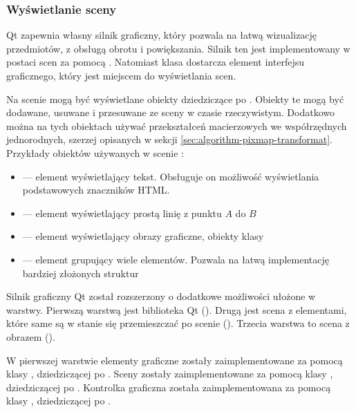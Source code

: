 \subsubsection{Wyświetlanie sceny}
\par
Qt zapewnia własny silnik graficzny, który pozwala na łatwą wizualizację przedmiotów, z obsługą obrotu i powiększania.
Silnik ten jest implementowany w postaci scen za pomocą .
Natomiast klasa  dostarcza element interfejsu graficznego, który jest miejscem do wyświetlania scen.
\par
Na scenie mogą być wyświetlane obiekty dziedziczące po .
Obiekty te mogą być dodawane, usuwane i przesuwane ze sceny w czasie rzeczywistym.
Dodatkowo można na tych obiektach używać przekształceń macierzowych we współrzędnych jednorodnych, szerzej opisanych w sekcji \ref{sec:algorithm-pixmap-transformat}.
Przykłady obiektów używanych w scenie :
\begin{itemize}
    \item {} --- element wyświetlający tekst.
          Obsługuje on możliwość wyświetlania podstawowych znaczników HTML.
    \item {} --- element wyświetlający prostą linię z punktu $A$ do $B$
    \item {} --- element wyświetlający obrazy graficzne, obiekty klasy 
    \item {} --- element grupujący wiele elementów.
          Pozwala na łatwą implementację bardziej złożonych struktur
\end{itemize}
\par
Silnik graficzny Qt został rozszerzony o dodatkowe możliwości ułożone w warstwy.
Pierwszą warstwą jest biblioteka Qt ().
Drugą jest scena z elementami, które same są w stanie się przemieszczać po scenie ().
Trzecia warstwa to scena z obrazem \DICOM ().
\par
W pierwszej warstwie elementy graficzne zostały zaimplementowane za pomocą klasy , dziedziczącej po .
Sceny zostały zaimplementowane za pomocą klasy , dziedziczącej po .
Kontrolka graficzna została zaimplementowana za pomocą klasy , dziedziczącej po .
\par
